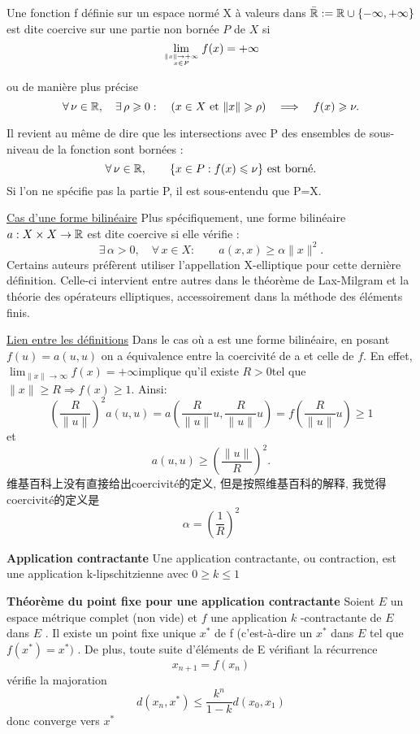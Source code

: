 \documentclass[openany]{book}
\begin{document}
Une fonction f d\'efinie sur un espace norm\'e X \`a valeurs dans $ \bar{\mathbb{R}}:=\mathbb{R}\cup\{-\infty,+\infty\}$ est dite coercive sur une partie non born\'ee $ P$ de $X$ si
$$
\lim_{\| x\|\to+\infty\atop x\in P}f(x)=+\infty
$$

ou de mani\`ere plus pr\'ecise
$$
\forall\,\nu\in\mathbb{R},\quad \exists\,\rho\geqslant0:\quad (x\in X ~\mbox{et}~ \|x\|\geqslant\rho) \quad\Longrightarrow\quad f(x)\geqslant\nu.
$$

Il revient au m\^eme de dire que les intersections avec P des ensembles de sous-niveau de la fonction sont born\'ees :
$$
\forall\,\nu\in\mathbb{R},\qquad\{x\in P: f(x)\leqslant\nu\}~\mbox{est born\'e.}
$$
Si l'on ne sp\'ecifie pas la partie P, il est sous-entendu que P=X.

\underline{Cas d'une forme bilin\'eaire} \newline
Plus sp\'ecifiquement, une forme bilin\'eaire $a:X\times X\to\mathbb{R}$ est dite coercive si elle v\'erifie :
$$
\exists\,\alpha>0,\quad\forall\,x\in X:\qquad a(x,x) \geqslant \alpha\|x\|^2.
$$
Certains auteurs pr\'ef\`erent utiliser l'appellation X-elliptique pour cette derni\`ere d\'efinition. Celle-ci intervient entre autres dans le th\'eor\`eme de Lax-Milgram et la th\'eorie des op\'erateurs elliptiques, accessoirement dans la m\'ethode des \'el\'ements finis.

\underline{Lien entre les d\'efinitions}\newline
Dans le cas où a est une forme bilin\'eaire, en posant $f(u)=a(u,u)$ on a \'equivalence entre la coercivit\'e de a et celle de $f$. En effet, $\scriptstyle\lim_{\| x\|\to\infty}f(x)=+\infty $implique qu'il existe $R>0 $tel que $\scriptstyle\|x\|\geqslant R\Rightarrow f(x)\geqslant 1$. Ainsi:
$$
\left(\frac{R}{\|u\|}\right)^2a(u,u)=a\left(\frac{R}{\|u\|}u,\frac{R}{\|u\|}u\right)=f\left(\frac{R}{\|u\|}u\right)\geqslant 1
$$
et
$$
a(u,u)\geqslant\left(\frac{\|u\|}{R}\right)^2.
$$
维基百科上没有直接给出coercivit\'e的定义, 但是按照维基百科的解释, 我觉得coercivit\'e的定义是
$$
 \alpha=\left(\frac{1}{R}\right)^2
$$

\bigskip
\textbf{Application contractante}\newline
Une application contractante, ou contraction, est une application k-lipschitzienne avec $0 \geq k \le 1$
\bigskip

\textbf{Th\'eor\`eme du point fixe pour une application contractante}\newline
Soient $ E$  un espace m\'etrique complet (non vide) et $ f$  une application $ k$ -contractante de $ E$  dans $ E$ . Il existe un point fixe unique $x^*$ de f (c'est-\`a-dire un $x^*$ dans $ E$  tel que $ f(x^* ) = x^*)$ . De plus, toute suite d'\'el\'ements de E v\'erifiant la r\'ecurrence
$$x_{n+1}=f(x_n)$$
v\'erifie la majoration
$$d(x_n,x^*) \le \frac {k^n}{1-k} d(x_0,x_1)$$
donc converge vers $x^*$
\bigskip
\end{document}
